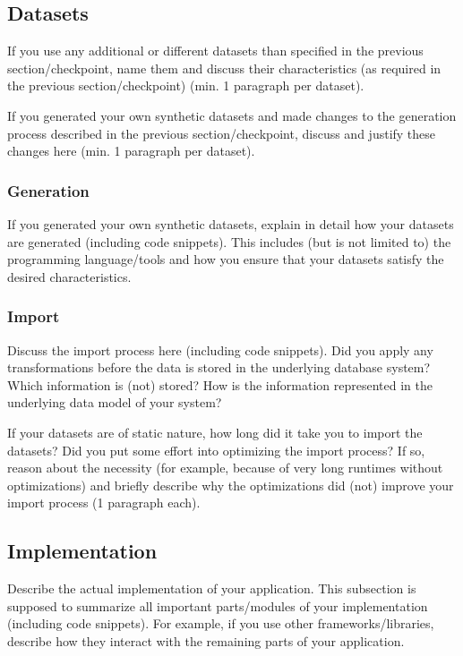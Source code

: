 \subsection{Datasets}

If you use any additional or different datasets than specified in the previous
section/checkpoint, name them and discuss their characteristics (as required in
the previous section/checkpoint) (min. 1 paragraph per dataset).

If you generated your own synthetic datasets and made changes to the generation
process described in the previous section/checkpoint, discuss and justify these
changes here (min. 1 paragraph per dataset).

\subsubsection{Generation}

If you generated your own synthetic datasets, explain in detail how your
datasets are generated (including code snippets). This includes (but is not
limited to) the programming language/tools and how you ensure that your datasets
satisfy the desired characteristics.

\subsubsection{Import}

Discuss the import process here (including code snippets). Did you apply any
transformations before the data is stored in the underlying database system?
Which information is (not) stored? How is the information represented in the
underlying data model of your system?

If your datasets are of static nature, how long did it take you to import the
datasets? Did you put some effort into optimizing the import process? If so,
reason about the necessity (for example, because of very long runtimes without
optimizations) and briefly describe why the optimizations did (not) improve your
import process (1 paragraph each).

\subsection{Implementation}

Describe the actual implementation of your application. This subsection is
supposed to summarize all important parts/modules of your implementation
(including code snippets). For example, if you use other frameworks/libraries,
describe how they interact with the remaining parts of your application.

